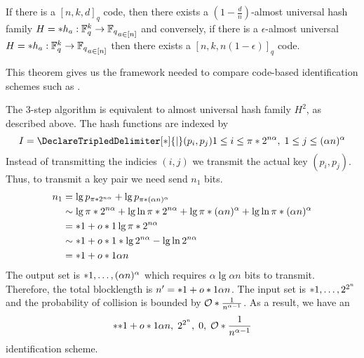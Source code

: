 \begin{theorem}\label{thm:hasheqid}
    If there is a \([n,k,d]_q\) code, then there exists a \((1- \frac{d}{n})\)-almost universal hash family \(H = \set{h_a : \mathbb{F}_q^k \to \mathbb{F}_q}_{a \in [n]}\) and conversely, if there is a \(\epsilon\)-almost universal  \(H = \set{h_a :  \mathbb{F}_q^k \to \mathbb{F}_q}_{a \in [n]}\) then there exists a \([n, k,n(1- \epsilon)]_q\) code.
\end{theorem}

This theorem gives us the framework needed to compare code-based identification schemes such as \cite{derebeyoglu}.

\begin{example}
    The 3-step algorithm is equivalent to almost universal hash family \(H^2\), as described above. The hash functions are indexed by
    \begin{equation}
        I = \set<(p_i,p_j)>{1 \leq i \leq \func{\pi}{2^{n\alpha}},\; 1 \leq j \leq (\alpha n)^{\alpha} }
    \end{equation}
    Instead of transmitting the indicies \((i,j)\) we transmit the actual key \((p_i,p_j)\). Thus, to transmit a key pair we need send \(n_1\) bits.
    \begin{align}
        n_1 &= \lg p_{\func{\pi}{2^{n\alpha}}} + \lg p_{\func{\pi}{(\alpha n)^{\alpha}}}\\
        &\sim \lg \func{\pi}{2^{n\alpha}} + \lg \ln \func{\pi}{2^{n\alpha}} + \lg \func{\pi}{(\alpha n)^{\alpha}} + \lg \ln \func{\pi}{(\alpha n)^{\alpha}}\\
        &= \bracket{1 + \littleO{1}} \lg \func{\pi}{2^{n\alpha}}\\
        &\sim \bracket{1 + \littleO{1}} \bracket{\lg {2^{n\alpha}} - \lg \ln 2^{n\alpha}}\\
        &= \bracket{1 + \littleO{1}} \alpha n
    \end{align}
    The output set is \(\set{1,\dots, (\alpha n)^{\alpha}}\) which requires \(\alpha \lg \alpha n\) bits to transmit. Therefore, the total blocklength is \(n' = \bracket{1 + \littleO{1}} \alpha n\). The input set is \(\set{1,\dots, 2^{2^n}}\) and the probability of collision is bounded by \(\bigO{\frac{1}{n^{\alpha - 1}}}\). As a result, we have an 
    \begin{equation}
        \bracket{\bracket{1 + \littleO{1}} \alpha n,\; 2^{2^n},\; 0,\; \bigO{\dfrac{1}{n^{\alpha - 1}}}}
    \end{equation}
    identification scheme.
\end{example}


